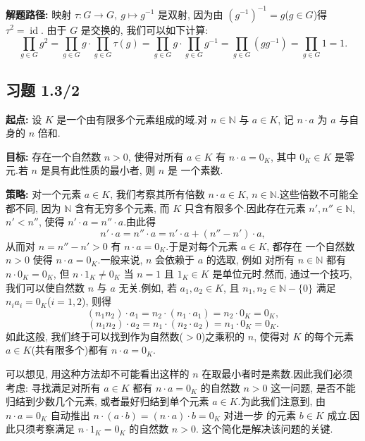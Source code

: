\noindent\textbf{解题路径:} 映射 $\tau \colon G \longrightarrow G,\ g \longmapsto g^{-1}$
是双射, 因为由 $(g^{-1})^{-1} = g$($g \in G$)得 $\tau^2 = \operatorname{id}$.
由于 $G$ 是交换的, 我们可以如下计算:
\[
\prod_{g \in G} g^2 = \prod_{g \in G} g \cdot \prod_{g \in G} \tau(g)
= \prod_{g \in G} g \cdot \prod_{g \in G} g^{-1}
= \prod_{g \in G} (g g^{-1}) = \prod_{g \in G} 1 = 1\text{.}
\]

\subsection*{习题 1.3/2}

\noindent\textbf{起点:} 设 $K$ 是一个由有限多个元素组成的域.对 $n \in \mathbb{N}$
与 $a \in K$, 记 $n \cdot a$ 为 $a$ 与自身的 $n$ 倍和.

\noindent\textbf{目标:} 存在一个自然数 $n > 0$, 使得对所有 $a \in K$ 有
$n \cdot a = 0_K$, 其中 $0_K \in K$ 是零元.若 $n$ 是具有此性质的最小者, 则 $n$ 是
一个素数.

\noindent\textbf{策略:} 对一个元素 $a \in K$, 我们考察其所有倍数
$n \cdot a \in K$, $n \in \mathbb{N}$.这些倍数不可能全都不同, 因为
$\mathbb{N}$ 含有无穷多个元素, 而 $K$ 只含有限多个.因此存在元素
$n', n'' \in \mathbb{N}$, $n' < n''$, 使得 $n' \cdot a = n'' \cdot a$.由此得
\[
n' \cdot a = n'' \cdot a = n' \cdot a + (n'' - n') \cdot a,
\]
从而对 $n = n'' - n' > 0$ 有 $n \cdot a = 0_K$.于是对每个元素 $a \in K$, 都存在
一个自然数 $n > 0$ 使得 $n \cdot a = 0_K$.一般来说, $n$ 会依赖于 $a$ 的选取, 例如
对所有 $n \in \mathbb{N}$ 都有 $n \cdot 0_K = 0_K$, 但 $n \cdot 1_K \neq 0_K$ 当
$n = 1$ 且 $1_K \in K$ 是单位元时.然而, 通过一个技巧, 我们可以使自然数 $n$ 与 $a$
无关.例如, 若 $a_1, a_2 \in K$, 且 $n_1, n_2 \in \mathbb{N} - \{ 0 \}$ 满足
$n_i a_i = 0_K$($i = 1, 2$), 则得
\[
(n_1 n_2) \cdot a_1 = n_2 \cdot (n_1 \cdot a_1) = n_2 \cdot 0_K = 0_K,
\]
\[
(n_1 n_2) \cdot a_2 = n_1 \cdot (n_2 \cdot a_2) = n_1 \cdot 0_K = 0_K\text{.}
\]
如此这般, 我们终于可以找到作为自然数($> 0$)之乘积的 $n$, 使得对 $K$ 的每个元素
$a \in K$(共有限多个)都有 $n \cdot a = 0_K$.

可以想见, 用这种方法却不可能看出这样的 $n$ 在取最小者时是素数.因此我们必须考虑:
寻找满足对所有 $a \in K$ 都有 $n \cdot a = 0_K$ 的自然数 $n > 0$ 这一问题, 是否不能
归结到少数几个元素, 或者最好归结到单个元素 $a \in K$.为此我们注意到, 由
$n \cdot a = 0_K$ 自动推出 $n \cdot (a \cdot b) = (n \cdot a) \cdot b = 0_K$ 对进一步
的元素 $b \in K$ 成立.因此只须考察满足 $n \cdot 1_K = 0_K$ 的自然数 $n > 0$.
这个简化是解决该问题的关键.

